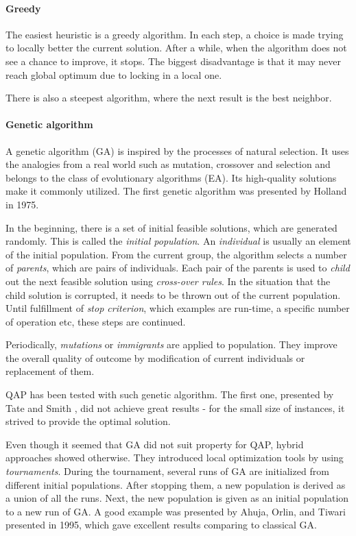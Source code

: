 \paragraph{Greedy}

The easiest heuristic is a greedy algorithm.
In each step, a choice is made trying to locally better the current solution.
After a while, when the algorithm does not see a chance to improve, it stops.
The biggest disadvantage is that it may never reach global optimum due to locking in a local one.

There is also a steepest algorithm, where the next result is the best neighbor.


\paragraph{Genetic algorithm}

A genetic algorithm (GA) is inspired by the processes of natural selection.
It uses the analogies from a real world such as mutation, crossover and selection and belongs to the class of evolutionary algorithms (EA).
Its high-quality solutions make it commonly utilized.
The first genetic algorithm was presented by Holland \cite{holland1975adaptation} in 1975.

In the beginning, there is a set of initial feasible solutions, which are generated randomly.
This is called the \textit{initial population}.
An \textit{individual} is usually an element of the initial population.
From the current group, the algorithm selects a number of \textit{parents}, which are pairs of individuals.
Each pair of the parents is used to \textit{child} out the next feasible solution using \textit{cross-over rules}.
In the situation that the child solution is corrupted, it needs to be thrown out of the current population.
Until fulfillment of \textit{stop criterion}, which examples are run-time, a specific number of operation etc, these steps are continued.

Periodically, \textit{mutations} or \textit{immigrants} are applied to population.
They improve the overall quality of outcome by modification of current individuals or replacement of them.

QAP has been tested with such genetic algorithm.
The first one, presented by Tate and Smith \cite{tate1995genetic}, did not achieve great results - for the small size of instances, it strived to provide the optimal solution.

Even though it seemed that GA did not suit property for QAP, hybrid approaches showed otherwise.
They introduced local optimization tools by using \textit{tournaments}.
During the tournament, several runs of GA are initialized from different initial populations.
After stopping them, a new population is derived as a union of all the runs.
Next, the new population is given as an initial population to a new run of GA.
A good example was presented by Ahuja, Orlin, and Tiwari \cite{ahuja2000greedy} presented in 1995, which gave excellent results comparing to classical GA.

